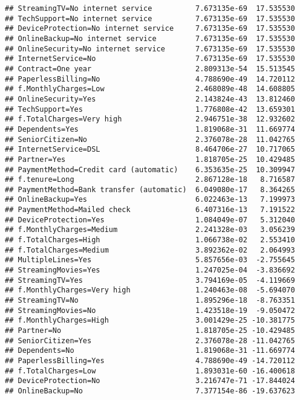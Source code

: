 \documentclass[
  a4paper]{article}
\begin{document}
\begin{verbatim}
## StreamingTV=No internet service          7.673135e-69  17.535530
## TechSupport=No internet service          7.673135e-69  17.535530
## DeviceProtection=No internet service     7.673135e-69  17.535530
## OnlineBackup=No internet service         7.673135e-69  17.535530
## OnlineSecurity=No internet service       7.673135e-69  17.535530
## InternetService=No                       7.673135e-69  17.535530
## Contract=One year                        2.809313e-54  15.513545
## PaperlessBilling=No                      4.788690e-49  14.720112
## f.MonthlyCharges=Low                     2.468089e-48  14.608805
## OnlineSecurity=Yes                       2.143824e-43  13.812460
## TechSupport=Yes                          1.776808e-42  13.659301
## f.TotalCharges=Very high                 2.946751e-38  12.932602
## Dependents=Yes                           1.819068e-31  11.669774
## SeniorCitizen=No                         2.376078e-28  11.042765
## InternetService=DSL                      8.464706e-27  10.717065
## Partner=Yes                              1.818705e-25  10.429485
## PaymentMethod=Credit card (automatic)    6.353635e-25  10.309947
## f.tenure=Long                            2.867128e-18   8.716587
## PaymentMethod=Bank transfer (automatic)  6.049080e-17   8.364265
## OnlineBackup=Yes                         6.022463e-13   7.199973
## PaymentMethod=Mailed check               6.407316e-13   7.191522
## DeviceProtection=Yes                     1.084049e-07   5.312040
## f.MonthlyCharges=Medium                  2.241328e-03   3.056239
## f.TotalCharges=High                      1.066738e-02   2.553410
## f.TotalCharges=Medium                    3.892362e-02   2.064993
## MultipleLines=Yes                        5.857656e-03  -2.755645
## StreamingMovies=Yes                      1.247025e-04  -3.836692
## StreamingTV=Yes                          3.794169e-05  -4.119669
## f.MonthlyCharges=Very high               1.240463e-08  -5.694070
## StreamingTV=No                           1.895296e-18  -8.763351
## StreamingMovies=No                       1.423518e-19  -9.050472
## f.MonthlyCharges=High                    3.001429e-25 -10.381775
## Partner=No                               1.818705e-25 -10.429485
## SeniorCitizen=Yes                        2.376078e-28 -11.042765
## Dependents=No                            1.819068e-31 -11.669774
## PaperlessBilling=Yes                     4.788690e-49 -14.720112
## f.TotalCharges=Low                       1.893031e-60 -16.400618
## DeviceProtection=No                      3.216747e-71 -17.844024
## OnlineBackup=No                          7.377154e-86 -19.637623

\end{verbatim}
\end{document}
